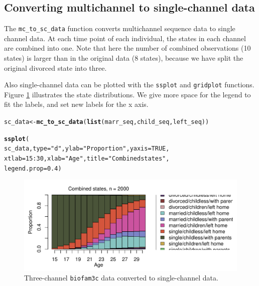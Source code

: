 \documentclass[12pt]{article}\usepackage[]{graphicx}\usepackage[]{color}
\makeatletter
\def\maxwidth{ %
  \ifdim\Gin@nat@width>\linewidth
    \linewidth
  \else
    \Gin@nat@width
  \fi
}
\newcommand{\hlnum}[1]{\textcolor[rgb]{0.686,0.059,0.569}{#1}}%
\newcommand{\hlstr}[1]{\textcolor[rgb]{0.192,0.494,0.8}{#1}}%
\newcommand{\hlopt}[1]{\textcolor[rgb]{0,0,0}{#1}}%
\newcommand{\hlstd}[1]{\textcolor[rgb]{0.345,0.345,0.345}{#1}}%
\newcommand{\hlkwb}[1]{\textcolor[rgb]{0.69,0.353,0.396}{#1}}%
\newcommand{\hlkwc}[1]{\textcolor[rgb]{0.333,0.667,0.333}{#1}}%
\newcommand{\hlkwd}[1]{\textcolor[rgb]{0.737,0.353,0.396}{\textbf{#1}}}%
\newenvironment{kframe}{%
 \def\at@end@of@kframe{}%
 \ifinner\ifhmode%
  \def\at@end@of@kframe{\end{minipage}}%
  \begin{minipage}{\columnwidth}%
 \fi\fi%
 \def\FrameCommand##1{\hskip\@totalleftmargin \hskip-\fboxsep
 \colorbox{shadecolor}{##1}\hskip-\fboxsep
     \hskip-\linewidth \hskip-\@totalleftmargin \hskip\columnwidth}%
 \MakeFramed {\advance\hsize-\width
   \@totalleftmargin\z@ \linewidth\hsize
   \@setminipage}}%
 {\par\unskip\endMakeFramed%
 \at@end@of@kframe}
\newenvironment{knitrout}{}{} %
\makeatother
\begin{document}
\subsection{Converting multichannel to single-channel data}

The \texttt{mc\_to\_sc\_data} function converts multichannel sequence data to single channel data. At each time point of each individual, the states in each channel are combined into one. Note that here the number of combined observations (10 states) is larger than in the original data (8 states), because we have split the original divorced state into three.

Also single-channel data can be plotted with the \texttt{ssplot} and  \texttt{gridplot} functions. Figure \ref{fig:MCtSCdata} illustrates the state distributions. We give more space for the legend to fit the labels, and set new labels for the x axis.

\begin{knitrout}
\color{fgcolor}\begin{kframe}
\begin{alltt}
\hlstd{sc_data} \hlkwb{<-} \hlkwd{mc_to_sc_data}\hlstd{(}\hlkwd{list}\hlstd{(marr_seq, child_seq, left_seq))}

\hlkwd{ssplot}\hlstd{(}
  \hlstd{sc_data,} \hlkwc{type} \hlstd{=} \hlstr{"d"}\hlstd{,} \hlkwc{ylab} \hlstd{=} \hlstr{"Proportion"}\hlstd{,} \hlkwc{yaxis} \hlstd{=} \hlnum{TRUE}\hlstd{,}
  \hlkwc{xtlab} \hlstd{=} \hlnum{15}\hlopt{:}\hlnum{30}\hlstd{,} \hlkwc{xlab} \hlstd{=} \hlstr{"Age"}\hlstd{,} \hlkwc{title} \hlstd{=} \hlstr{"Combined states"}\hlstd{,}
  \hlkwc{legend.prop} \hlstd{=} \hlnum{0.4}\hlstd{)}
\end{alltt}
\end{kframe}\begin{figure}

{\centering \includegraphics[width=\maxwidth]{figure/MCtSCdata-1} 

}

\caption[Three-channel \texttt{biofam3c} data converted to single-channel data]{Three-channel \texttt{biofam3c} data converted to single-channel data.}\label{fig:MCtSCdata}
\end{figure}


\end{knitrout}
\end{document}
